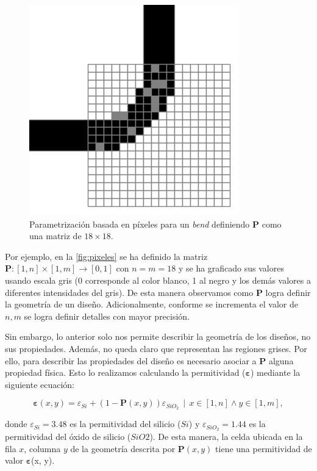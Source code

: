 \begin{figure}[h]
  \centering
  \includegraphics[scale=0.7]{image/theory/parametrization-pixeles.png}
  \caption{Parametrización basada en píxeles para un \emph{bend} definiendo $\boldsymbol{P}$ como una matriz de $18 \times 18$.}
  \label{fig:pixeles}
\end{figure}

Por ejemplo, en la \autoref{fig:pixeles} se ha definido la matriz $\boldsymbol{P}: [1, n] \times [1, m]
\to [0, 1]$ con $n = m = 18$ y se ha graficado sus valores
usando escala gris (0 corresponde al color blanco, 1 al negro y los demás valores a diferentes
intensidades del gris). De esta manera observamos como $\boldsymbol{P}$ logra definir la geometría de un
diseño.
Adicionalmente, conforme se incrementa el valor de $n, m$ se logra definir detalles con mayor precisión.


Sin embargo, lo anterior solo nos permite describir la geometría de los diseños, no sus propiedades.
Además, no queda claro que representan las regiones grises.
Por ello, para describir las propiedades del diseño es necesario asociar a $\boldsymbol{P}$ alguna propiedad física.
Esto lo realizamos calculando la permitividad ($\boldsymbol{\varepsilon}$) mediante la siguiente ecuación:

\begin{equation}
  \boldsymbol{\varepsilon}(x, y) = \varepsilon_{Si} + (1 - \boldsymbol{P}(x, y))
  \varepsilon_{SiO_2} \, \mid \, x \in [1, n] \land y \in [1, m],
\label{eq:permitivity}
\end{equation}

donde $\varepsilon_{Si} = 3.48$ es la permitividad del silicio ($Si$) y
$\varepsilon_{SiO_2} = 1.44$ es la permitividad del óxido de silicio ($SiO2$).
De esta manera, la celda ubicada en la fila $x$, columna $y$ de la geometría descrita por 
$\boldsymbol{P}(x, y)$ tiene una permitividad de valor $\boldsymbol{\varepsilon}$(x, y).


